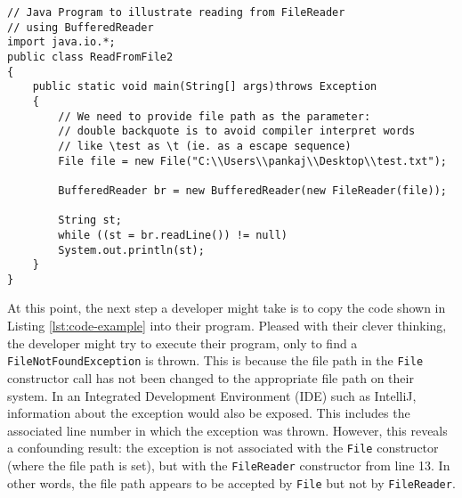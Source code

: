\centering
\begin{lstlisting}[tabsize=4,caption={File reading java code example from GeeksforGeeks},label={lst:code-example}]
// Java Program to illustrate reading from FileReader 
// using BufferedReader 
import java.io.*; 
public class ReadFromFile2 
{ 
	public static void main(String[] args)throws Exception 
	{ 
		// We need to provide file path as the parameter: 
		// double backquote is to avoid compiler interpret words 
		// like \test as \t (ie. as a escape sequence) 
		File file = new File("C:\\Users\\pankaj\\Desktop\\test.txt"); 
		
		BufferedReader br = new BufferedReader(new FileReader(file)); 
		
		String st; 
		while ((st = br.readLine()) != null) 
		System.out.println(st); 
	} 
} 
\end{lstlisting}
\flushleft

At this point, the next step a developer might take is to copy the code shown in Listing \ref{lst:code-example} into their program. Pleased with their clever thinking, the developer might try to execute their program, only to find a \lstinline{FileNotFoundException} is thrown. This is because the file path in the \lstinline{File} constructor call has not been changed to the appropriate file path on their system. In an Integrated Development Environment (IDE) such as IntelliJ,  information about the exception would also be exposed. This includes the associated line number in which the exception was thrown. However, this reveals a confounding result: the exception is not associated with the \lstinline{File} constructor (where the file path is set), but with the \lstinline{FileReader} constructor from line 13. In other words, the file path appears to be accepted by \lstinline{File} but not by \lstinline{FileReader}. \bigbreak

